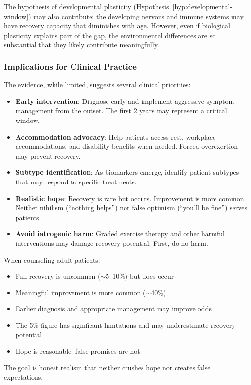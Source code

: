 The hypothesis of developmental plasticity (Hypothesis~\ref{hyp:developmental-window}) may also contribute: the developing nervous and immune systems may have recovery capacity that diminishes with age. However, even if biological plasticity explains part of the gap, the environmental differences are so substantial that they likely contribute meaningfully.

\subsubsection{Implications for Clinical Practice}

The evidence, while limited, suggests several clinical priorities:

\begin{itemize}
    \item \textbf{Early intervention}: Diagnose early and implement aggressive symptom management from the outset. The first 2 years may represent a critical window.
    \item \textbf{Accommodation advocacy}: Help patients access rest, workplace accommodations, and disability benefits when needed. Forced overexertion may prevent recovery.
    \item \textbf{Subtype identification}: As biomarkers emerge, identify patient subtypes that may respond to specific treatments.
    \item \textbf{Realistic hope}: Recovery is rare but occurs. Improvement is more common. Neither nihilism (``nothing helps'') nor false optimism (``you'll be fine'') serves patients.
    \item \textbf{Avoid iatrogenic harm}: Graded exercise therapy and other harmful interventions may damage recovery potential. First, do no harm.
\end{itemize}

\begin{keypoint}
When counseling adult patients:
\begin{itemize}
    \item Full recovery is uncommon ($\sim$5--10\%) but does occur
    \item Meaningful improvement is more common ($\sim$40\%)
    \item Earlier diagnosis and appropriate management may improve odds
    \item The 5\% figure has significant limitations and may underestimate recovery potential
    \item Hope is reasonable; false promises are not
\end{itemize}
The goal is honest realism that neither crushes hope nor creates false expectations.
\end{keypoint}

